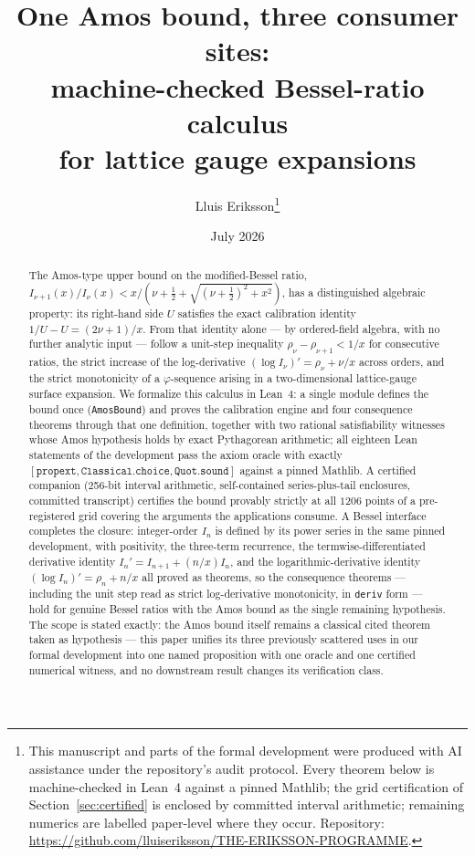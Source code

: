 \documentclass[11pt]{article}
\title{One Amos bound, three consumer sites:\\
machine-checked Bessel-ratio calculus\\
for lattice gauge expansions}
\author{Lluis Eriksson\thanks{This manuscript and parts of the formal
development were produced with AI assistance under the repository's
audit protocol.  Every theorem below is machine-checked in Lean~4
against a pinned Mathlib; the grid certification of
Section~\ref{sec:certified} is enclosed by committed interval
arithmetic; remaining numerics are labelled paper-level where they
occur.  Repository:
\url{https://github.com/lluiseriksson/THE-ERIKSSON-PROGRAMME}.}}
\date{July 2026}
\newcommand{\lean}[1]{\texttt{#1}}
\begin{document}
\maketitle

\begin{abstract}
The Amos-type upper bound on the modified-Bessel ratio,
$I_{\nu+1}(x)/I_\nu(x) < x/(\nu + \tfrac12 + \sqrt{(\nu+\tfrac12)^2 +
x^2})$, has a distinguished algebraic property: its right-hand side
$U$ satisfies the exact calibration identity $1/U - U =
(2\nu+1)/x$.  From that identity alone --- by ordered-field algebra,
with no further analytic input --- follow a unit-step inequality
$\rho_\nu - \rho_{\nu+1} < 1/x$ for consecutive ratios, the
strict increase of the log-derivative $(\log I_\nu)' = \rho_\nu +
\nu/x$ across orders, and the strict monotonicity of a
$\varphi$-sequence arising in a two-dimensional lattice-gauge
surface expansion.  We formalize this calculus in Lean~4: a single
module defines the bound once (\lean{AmosBound}) and proves the
calibration engine and four consequence theorems through that one
definition, together with two rational satisfiability witnesses
whose Amos hypothesis holds by exact Pythagorean arithmetic; all
eighteen Lean statements of the development pass the axiom oracle
with exactly
$[\lean{propext}, \lean{Classical.choice}, \lean{Quot.sound}]$
against a pinned Mathlib.  A certified companion (256-bit interval
arithmetic, self-contained series-plus-tail enclosures, committed
transcript) certifies the bound provably strictly at all $1206$
points of a pre-registered grid covering the arguments the
applications consume.  A Bessel interface completes the closure:
integer-order $I_n$ is defined by its power series in the same
pinned development, with positivity, the three-term recurrence,
the termwise-differentiated derivative identity
$I_n' = I_{n+1} + (n/x) I_n$, and the logarithmic-derivative
identity $(\log I_n)' = \rho_n + n/x$ all proved as theorems, so
the consequence theorems --- including the unit step read as strict
log-derivative monotonicity, in \lean{deriv} form --- hold for
genuine Bessel ratios with the Amos bound as the single remaining
hypothesis.  The scope is stated exactly: the Amos bound
itself remains a classical cited theorem taken as hypothesis ---
this paper unifies its three previously scattered uses in our
formal development into one named proposition with one oracle and
one certified numerical witness, and no downstream result changes
its verification class.
\end{abstract}
\end{document}
